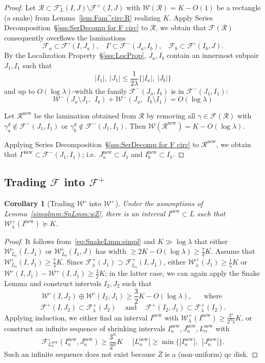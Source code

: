 \documentclass{amsart}
\renewcommand{\sp}{{\ \ }}
\newcommand{\1}{{\mathbb 1 }}
\newcommand{\Fam}{{\mathcal F}}
\newcommand{\Width}{{\mathcal W}}
\newcommand\RR{\mathcal{R}}
\newcommand\new{{\operatorname{new}}}
\newtheorem{cor}[thm]{Corollary}
\theoremstyle{remark}
\numberwithin{equation}{section}
\theoremstyle{definition}
\begin{document}
\begin{proof}
 Let $\RR\subset \Fam^\circ_L(I,J)\setminus \Fam^+(I,J)$ with $\Width(\RR)=K-O(1)$ be a rectangle (a snake) from Lemma~\ref{lem:Fam^circ:R} realizing $K$. Apply Series Decomposition~\S\ref{sss:SerDecomp for F circ} to $\RR$, we obtain that $\Fam(\RR)$ consequently overflows the laminations \[\Fam_a\subset \Fam^\circ (I,J_a),\sp \sp \Gamma\subset \Fam^-(J_a,I_b),\sp \sp \Fam_b\subset \Fam^\circ (I_b, J).\]
By the Localization Property~\S\ref{sss:LocProp}, $J_a, I_b$ contain an innermost subpair $J_1,I_1$ such that \[ |I_1|, \ |J_1|\le \frac 1 {2\lambda} \{|I_a|,\ |J_b|\}\]
and up to $O(\log \lambda)$-width the family $\Fam^-(J_a,I_b)$ is in  $\Fam^-(J_1,I_1)$:
\[\Width^-(J_a\setminus J_1,\sp I_b) +\Width^-(J_a,\sp I_b\setminus I_1)=O(\log \lambda)\]
 
Let $\RR^\new$ be the lamination obtained from $\RR$ by removing all $\gamma\in \Fam(\RR)$ with $\gamma_a^d\not \in \Fam^-(J_1,I_1)$ or  $\gamma_b^d\not \in \Fam^-(J_1,I_1)$. Then $\Width(\RR^\new)=K-O(\log \lambda)$. 


Applying Series Decomposition~\S\ref{sss:SerDecomp for F circ}  to $\RR^\new$, we obtain that $\Gamma^\new\subset \Fam^-(J_1,I_1)$; i.e.~$J^\new_a\subset J_1$ and $I^\new_b\subset I_1$.

\end{proof}

\subsection{Trading $\Fam$ into $\Fam^+$}



\begin{cor}[Trading $\Width^\circ$ into $\Width^+$]
Under the assumptions of Lemma~\ref{simplmm:SnLmm:wZ}, there is an interval $I^\new\subset L$ such that $\Width^+_\lambda(I^\new)\succeq K$.
\end{cor}
\begin{proof}
It follows from~\eqref{eq:SnakeLmm:simpl} and $K\gg \log \lambda$ that either $\Width^\circ_{L_a} (I,J_1) $ or $\Width^\circ_{L_b} (I_1,J)$ has width $\ge 2K-O(\log \lambda)\ge \frac 7 4 K$. Assume that  $\Width^\circ_{L_a} (I,J_1) \ge \frac 74 K$. Since $\Fam^+_\lambda (J_1)\supset \Fam^+_{L_a} (I,J_1)$, either $\Width^+_\lambda(J_1)\ge \frac 1 5 K$ or $ \Width^\circ(I,J_1) - \Width^+(I,J_1)\ge \frac32 K$; in the latter case, we can again apply the Snake Lemma and construct intervals $I_2,J_2$ such that
\[ \Width^\circ (I,J_2) \oplus\Width^\circ (I_2,J_1)\ge \frac 32K - O(\log \lambda),\sp\sp\sp\text{ where }\] 
 \[\Fam^+ (I,J_2)\subset \Fam^+_{\lambda}(J_2)\sp\sp\text{ and }\sp\sp \Fam^+ (I_2,J_1)\subset \Fam^+_{\lambda}(I_2).\]
 Applying induction, we either find an interval $I^\new$ with $\Width^+_\lambda(I^\new)\ge  \frac{3^n}{2^n5}K$, or construct an infinite sequence of shrinking intervals $I^\new_n,J_n^\new, L^\new_n$ with \[\Fam^\circ_{L_n^\new}(I^\new_n, J^\new_n)\ge \frac{3^n}{2^n}K\sp\sp\sp |L^\new_n|\ge \min\{|I^\new_n|,\sp |J^\new_n|\}.\] 
Such an infinite sequence does not exist because $\overline Z$ is a (non-uniform) qc disk. 
\end{proof}
\end{document}
